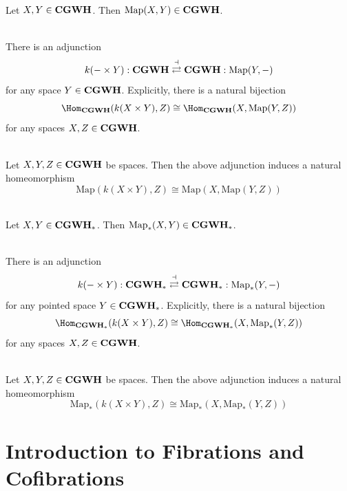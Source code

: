 \documentclass[a4paper]{article}
\begin{document}
\begin{prp}{}{}\\
Let $X,Y\in\bold{CGWH}$. Then $\text{Map}(X,Y)\in\bold{CGWH}$. 
\end{prp}

\begin{prp}{}{}\\
There is an adjunction $$k(-\times Y):\bold{CGWH}\overset{\dashv}{\rightleftarrows}\bold{CGWH}:\text{Map}(Y,-)$$ for any space $Y\in\bold{CGWH}$. Explicitly, there is a natural bijection $$\Hom_\bold{CGWH}(k(X\times Y),Z)\cong\Hom_\bold{CGWH}(X,\text{Map}(Y,Z))$$ for any spaces $X,Z\in\bold{CGWH}$. 
\end{prp}

\begin{prp}{}{}\\
Let $X,Y,Z\in\bold{CGWH}$ be spaces. Then the above adjunction induces a natural homeomorphism $$\text{Map}(k(X\times Y),Z)\cong\text{Map}(X,\text{Map}(Y,Z))$$
\end{prp}

\begin{prp}{}{}\\
Let $X,Y\in\bold{CGWH}_\ast$. Then $\text{Map}_\ast(X,Y)\in\bold{CGWH}_\ast$. 
\end{prp}

\begin{prp}{}{}\\
There is an adjunction $$k(-\times Y):\bold{CGWH}_\ast\overset{\dashv}{\rightleftarrows}\bold{CGWH}_\ast:\text{Map}_\ast(Y,-)$$ for any pointed space $Y\in\bold{CGWH}_\ast$. Explicitly, there is a natural bijection $$\Hom_{\bold{CGWH}_\ast}(k(X\times Y),Z)\cong\Hom_{\bold{CGWH}_\ast}(X,\text{Map}_\ast(Y,Z))$$ for any spaces $X,Z\in\bold{CGWH}$. 
\end{prp}

\begin{prp}{}{}\\
Let $X,Y,Z\in\bold{CGWH}$ be spaces. Then the above adjunction induces a natural homeomorphism $$\text{Map}_\ast(k(X\times Y),Z)\cong\text{Map}_\ast(X,\text{Map}_\ast(Y,Z))$$
\end{prp}

\pagebreak
\section{Introduction to Fibrations and Cofibrations}
\end{document}
